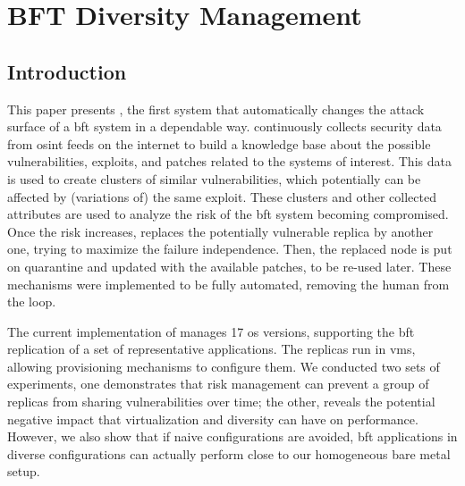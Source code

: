 \chapter{BFT Diversity Management}
\label{chap:lazarus_design}

\section{Introduction}



This paper presents \system, the first system that automatically changes the attack surface of a \gls{bft} system in a dependable way.
\system continuously collects security data from \gls{osint} feeds on the internet to build a knowledge base about the possible vulnerabilities, exploits, and patches related to the systems of interest.
This data is used to create clusters of similar vulnerabilities, which potentially can be affected by (variations of) the same exploit.
These clusters and other collected attributes are used to analyze the risk of the \gls{bft} system becoming compromised. %
Once the risk increases, \system replaces the potentially vulnerable replica by another one, trying to maximize the failure independence. %
Then, the replaced node is put on quarantine and updated with the available patches, to be re-used later.
These mechanisms were implemented to be fully automated, removing the human from the loop.

The current implementation of \system manages 17 \gls{os} versions, supporting the \gls{bft} replication of a set of representative applications.
The replicas run in \glspl{vm}, allowing provisioning mechanisms to configure them. 
We conducted two sets of experiments, one demonstrates that \system risk management can prevent a group of replicas from sharing vulnerabilities over time; the other, reveals the potential negative impact that virtualization and diversity can have on performance. However, we also show that if naive configurations are avoided, \gls{bft} applications in diverse configurations can actually perform close to our homogeneous bare metal setup.

